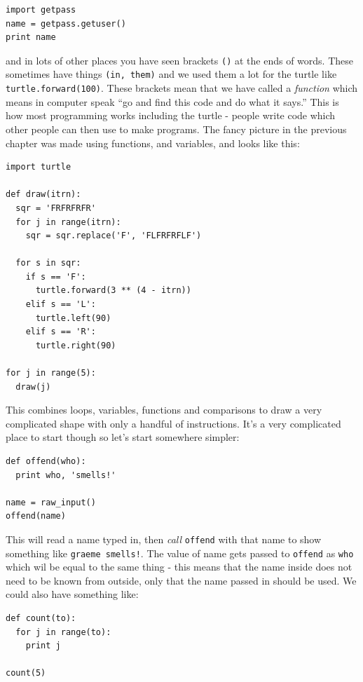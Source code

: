 \documentclass[a4paper, 11pt]{book}
\begin{document}
{\small
\begin{verbatim}
import getpass
name = getpass.getuser()
print name
\end{verbatim}
}

\noindent
and in lots of other places you have seen brackets \verb|()| at the
ends of words. These sometimes have things \verb|(in, them)| and we
used them a lot for the turtle like \verb|turtle.forward(100)|. These
brackets mean that we have called a \emph{function} which means in
computer speak ``go and find this code and do what it says.'' This is
how most programming works including the turtle - people write code
which other people can then use to make programs. The fancy picture in
the previous chapter was made using functions, and variables, and
looks like this:

{\small
\begin{verbatim}
import turtle

def draw(itrn):
  sqr = 'FRFRFRFR'
  for j in range(itrn):
    sqr = sqr.replace('F', 'FLFRFRFLF')
    
  for s in sqr:
    if s == 'F':
      turtle.forward(3 ** (4 - itrn))
    elif s == 'L':
      turtle.left(90)
    elif s == 'R':
      turtle.right(90)

for j in range(5):
  draw(j)
\end{verbatim}
}

This combines loops, variables, functions and comparisons to draw a
very complicated shape with only a handful of instructions. It's a
very complicated place to start though so let's start somewhere
simpler:

{\small
\begin{verbatim}
def offend(who):
  print who, 'smells!'

name = raw_input()
offend(name)
\end{verbatim}
}

This will read a name typed in, then \emph{call} \verb|offend| with
that name to show something like \verb|graeme smells!|.  The value of
name gets passed to \verb|offend| as \verb|who| which wil be equal to
the same thing - this means that the name inside does not need to be
known from outside, only that the name passed in should be used. We
could also have something like:

{\small
\begin{verbatim}
def count(to):
  for j in range(to):
    print j

count(5)
\end{verbatim}
}
\end{document}
